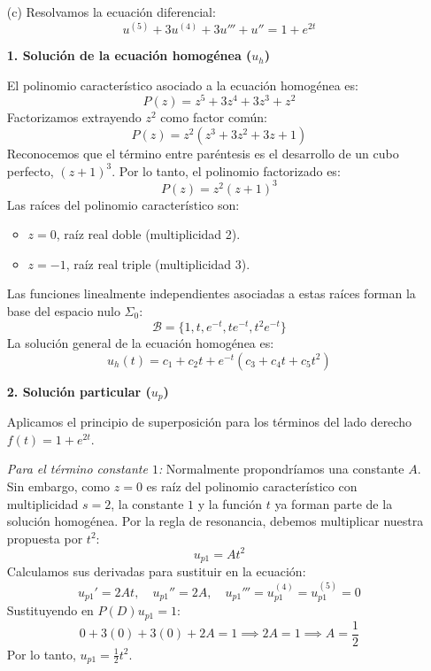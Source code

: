 {\begin{enumerate}
        \textbf{3. Solución general}

        Combinando todos los resultados, la solución general de la ecuación diferencial es:
        \[
            u(t) = c_1 e^t + c_2 e^{-t} + e^{2t}(c_3 \cos(3t) + c_4 \sin(3t)) - \frac{1}{13} + \frac{1}{27}e^{2t} + \frac{\alpha \cos(\omega t) + \beta \sin(\omega t)}{\alpha^2 + \beta^2}
        \]
        donde:
        \[
            \alpha = \omega^4 - 12\omega^2 - 13 \quad \text{y} \quad \beta = 4\omega^3 + 4\omega
        \]
        \item[(c)] 
        Resolvamos la ecuación diferencial:
        \[
            u^{(5)} + 3u^{(4)} + 3u''' + u'' = 1 + e^{2t}
        \]

        \textbf{1. Solución de la ecuación homogénea ($u_h$)}

        El polinomio característico asociado a la ecuación homogénea es:
        \[
            P(z) = z^5 + 3z^4 + 3z^3 + z^2
        \]
        Factorizamos extrayendo $z^2$ como factor común:
        \[
            P(z) = z^2 (z^3 + 3z^2 + 3z + 1)
        \]
        Reconocemos que el término entre paréntesis es el desarrollo de un cubo perfecto, $(z+1)^3$. Por lo tanto, el polinomio factorizado es:
        \[
            P(z) = z^2 (z+1)^3
        \]
        Las raíces del polinomio característico son:
        \begin{itemize}
            \item $z = 0$, raíz real doble (multiplicidad 2).
            \item $z = -1$, raíz real triple (multiplicidad 3).
        \end{itemize}
        Las funciones linealmente independientes asociadas a estas raíces forman la base del espacio nulo $\Sigma_0$:
        \[
            \mathcal{B} = \{ 1, t, e^{-t}, t e^{-t}, t^2 e^{-t} \}
        \]
        La solución general de la ecuación homogénea es:
        \[
            u_h(t) = c_1 + c_2 t + e^{-t}(c_3 + c_4 t + c_5 t^2)
        \]

        \textbf{2. Solución particular ($u_p$)}

        Aplicamos el principio de superposición para los términos del lado derecho $f(t) = 1 + e^{2t}$.

        \textit{Para el término constante $1$:}
        Normalmente propondríamos una constante $A$. Sin embargo, como $z = 0$ es raíz del polinomio característico con multiplicidad $s = 2$, la constante $1$ y la función $t$ ya forman parte de la solución homogénea. Por la regla de resonancia, debemos multiplicar nuestra propuesta por $t^2$:
        \[
            u_{p1} = A t^2
        \]
        Calculamos sus derivadas para sustituir en la ecuación:
        \[
            u_{p1}' = 2At, \quad u_{p1}'' = 2A, \quad u_{p1}''' = u_{p1}^{(4)} = u_{p1}^{(5)} = 0
        \]
        Sustituyendo en $P(D)u_{p1} = 1$:
        \[
            0 + 3(0) + 3(0) + 2A = 1 \implies 2A = 1 \implies A = \frac{1}{2}
        \]
        Por lo tanto, $u_{p1} = \frac{1}{2}t^2$.


\end{enumerate}}
